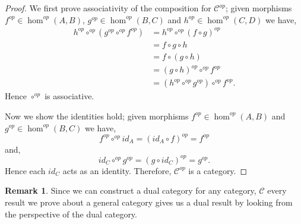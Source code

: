 \documentclass[11pt,a4paper]{article}
\theoremstyle{definition}
\newtheorem{remark}[thm]{Remark}
\newcommand\cat[1]{\mathscr{#1}}
\numberwithin{equation}{section}
\begin{document}
\begin{proof}
    We first prove associativity of the composition for $\cat{C}^{op}$; given morphisms $f^{op}\in\hom^{op}(A,B)$, $g^{op}\in\hom^{op}(B,C)$ and $h^{op}\in\hom^{op}(C,D)$ we have,
    \begin{align*}
        h^{op} \circ^{op} (g^{op}\circ^{op} f^{op}) &= h^{op} \circ^{op} (f\circ g)^{op}\\
        &= f\circ g \circ h\\
        &= f\circ (g\circ h)\\
        &= (g\circ h)^{op} \circ^{op} f^{op}\\
        &= (h^{op}\circ^{op} g^{op})\circ^{op} f^{op}.
    \end{align*} 
    Hence $\circ^{op}$ is associative.

    Now we show the identities hold;
    given morphisms  $f^{op}\in\hom^{op}(A,B)$ and $g^{op}\in\hom^{op}(B,C)$ we have,
    \[f^{op} \circ^{op} id_{A} = (id_{A} \circ f)^{op} = f^{op}\]
    and,
    \[id_{C}\circ^{op}g^{op} = (g\circ id_{C})^{op} = g^{op}.\]
    Hence each $id_{C}$ acts as an identity. Therefore, $\cat{C}^{op}$ is a category.
\end{proof}
\begin{remark}
    Since we can construct a dual category for any category, $\cat{C}$ every result we prove about a general category gives us a dual result by looking from the perspective of the dual category.
\end{remark}
\end{document}

